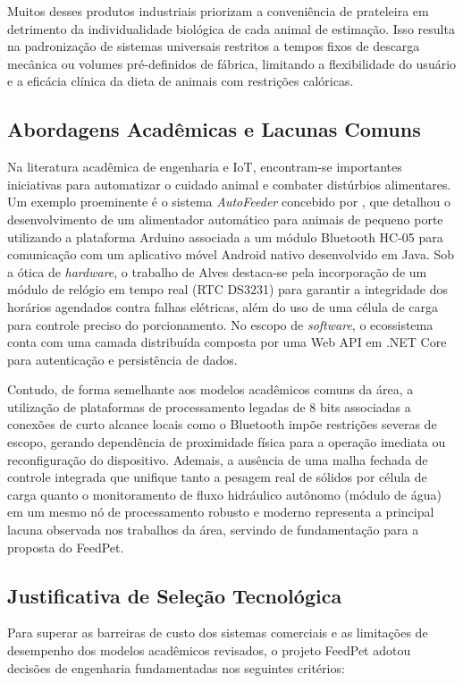 \documentclass[12pt]{article}\usepackage{sbc-template}\usepackage{graphicx,url}\usepackage[utf8]{inputenc}
\begin{document}
Muitos desses produtos industriais priorizam a conveniência de prateleira em detrimento da individualidade biológica de cada animal de estimação. Isso resulta na padronização de sistemas universais restritos a tempos fixos de descarga mecânica ou volumes pré-definidos de fábrica, limitando a flexibilidade do usuário e a eficácia clínica da dieta de animais com restrições calóricas.

\subsection{Abordagens Acadêmicas e Lacunas Comuns}
Na literatura acadêmica de engenharia e IoT, encontram-se importantes iniciativas para automatizar o cuidado animal e combater distúrbios alimentares. Um exemplo proeminente é o sistema \textit{AutoFeeder} concebido por \cite{alves:20}, que detalhou o desenvolvimento de um alimentador automático para animais de pequeno porte utilizando a plataforma Arduino associada a um módulo Bluetooth HC-05 para comunicação com um aplicativo móvel Android nativo desenvolvido em Java. Sob a ótica de \textit{hardware}, o trabalho de Alves destaca-se pela incorporação de um módulo de relógio em tempo real (RTC DS3231) para garantir a integridade dos horários agendados contra falhas elétricas, além do uso de uma célula de carga para controle preciso do porcionamento. No escopo de \textit{software}, o ecossistema conta com uma camada distribuída composta por uma Web API em .NET Core para autenticação e persistência de dados.

Contudo, de forma semelhante aos modelos acadêmicos comuns da área, a utilização de plataformas de processamento legadas de 8 bits associadas a conexões de curto alcance locais como o Bluetooth impõe restrições severas de escopo, gerando dependência de proximidade física para a operação imediata ou reconfiguração do dispositivo. Ademais, a ausência de uma malha fechada de controle integrada que unifique tanto a pesagem real de sólidos por célula de carga quanto o monitoramento de fluxo hidráulico autônomo (módulo de água) em um mesmo nó de processamento robusto e moderno representa a principal lacuna observada nos trabalhos da área, servindo de fundamentação para a proposta do FeedPet.

\subsection{Justificativa de Seleção Tecnológica}
Para superar as barreiras de custo dos sistemas comerciais e as limitações de desempenho dos modelos acadêmicos revisados, o projeto FeedPet adotou decisões de engenharia fundamentadas nos seguintes critérios:
\end{document}
